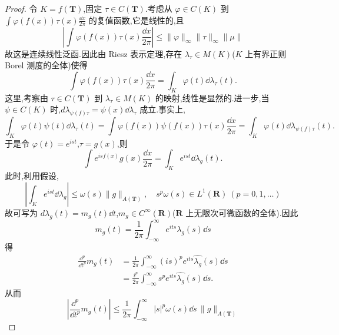 \begin{proof}
令 $K = f(\mathbf{T})$,固定 $\tau \in C(\mathbf{T})$.考虑从 $\varphi \in C(K)$ 到 $\int \varphi(f(x))\tau(x)\frac{\dd x}{2\pi}$ 的复值函数,它是线性的,且
\begin{equation*}
\left|\int \varphi(f(x))\tau(x)\frac{\dd x}{2\pi}\right| \leq \|\varphi\|_{\infty}\|\tau\|_{\infty}\|\mu\|
\end{equation*}
故这是连续线性泛函.因此由 Riesz 表示定理,存在 $\lambda_{\tau} \in M(K)$($K$ 上有界正则 Borel 测度的全体)使得
\begin{equation*}
\int \varphi(f(x))\tau(x)\frac{\dd x}{2\pi} = \int_{K}\varphi(t)\dd\lambda_{\tau}(t).
\end{equation*}
这里,考察由 $\tau \in C(\mathbf{T})$ 到 $\lambda_{\tau} \in M(K)$ 的映射,线性是显然的.进一步,当 $\psi \in C(K)$ 时,$d\lambda_{\psi(f)\tau} = \psi(x)\dd\lambda_{\tau}$ 成立.事实上,
\begin{equation*}
\int_{K}\varphi(t)\psi(t)\dd\lambda_{\tau}(t) = \int \varphi(f(x))\psi(f(x))\tau(x)\frac{\dd x}{2\pi} = \int_{K}\varphi(t)\dd\lambda_{\psi(f)\tau}(t).
\end{equation*}
于是令 $\varphi(t) = e^{ist}$,$\tau = g(x)$,则
\begin{equation*}
\int e^{isf(x)}g(x)\frac{\dd x}{2\pi} = \int_{K}e^{ist}\dd\lambda_{g}(t).
\end{equation*}
此时,利用假设,
\begin{equation*}
\left|\int_{K}e^{ist}\dd\lambda_{g}\right| \leq \omega(s)\|g\|_{A(\mathbf{T})}, \quad s^{p}\omega(s) \in L^{1}(\mathbf{R}) \ (p = 0, 1, \ldots)
\end{equation*}
故可写为 $d\lambda_{g}(t) = m_{g}(t)\dd t$,$m_{g} \in C^{\infty}(\mathbf{R})$($\mathbf{R}$ 上无限次可微函数的全体).因此
\begin{equation*}
m_{g}(t) = \frac{1}{2\pi}\int_{-\infty}^{\infty}e^{its}\widehat{\lambda_{g}}(s)\dd s
\end{equation*}
得
\begin{align*}
\frac{\dd^{p}}{\dd t^{p}}m_{g}(t) & = \frac{1}{2\pi}\int_{-\infty}^{\infty}(is)^{p}e^{its}\widehat{\lambda_{g}}(s)\dd s \\
& = \frac{i^{p}}{2\pi}\int_{-\infty}^{\infty}s^{p}e^{its}\widehat{\lambda_{g}}(s)\dd s.
\end{align*}
从而
\begin{equation*}
\left|\frac{\dd^{p}}{\dd t^{p}}m_{g}(t)\right| \leq \frac{1}{2\pi}\int_{-\infty}^{\infty}|s|^{p}\omega(s)\dd s\,\|g\|_{A(\mathbf{T})}
\end{equation*}

\end{proof}
